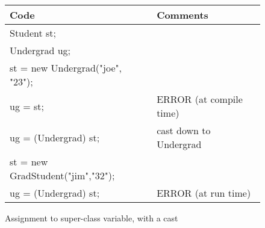 






\begin {figure}

\begin {tabular} {l | l }
Code	&	Comments	\\
\hline
Student st;			&			\\
Undergrad ug;			&			\\
st = new Undergrad("joe", "23");& 			\\
ug = st;			& ERROR (at compile time)	\\
ug = (Undergrad) st;		& cast down to Undergrad		\\
st = new GradStudent("jim","32");& 			\\
ug = (Undergrad) st;		& ERROR (at run time)	

\end {tabular}

\caption {Assignment to super-class variable, with a cast}


\label {fig:inherCast}

\end {figure}


